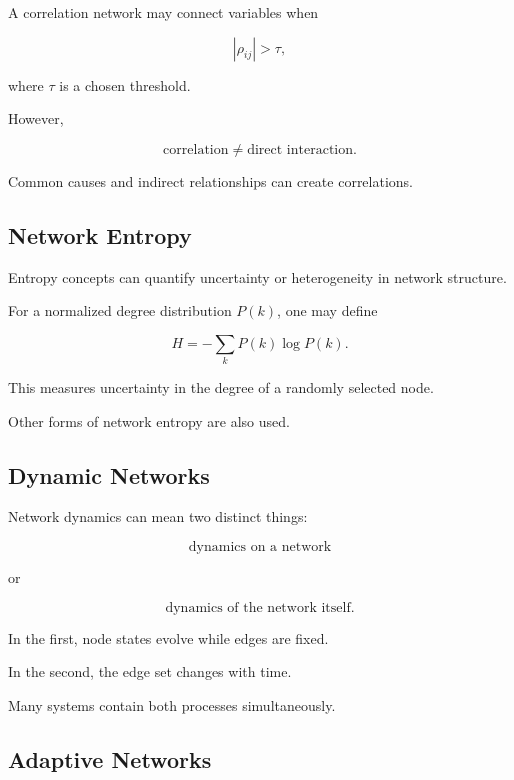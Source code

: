 A correlation network may connect variables when

\[
\boxed{
|\rho_{ij}|
>
\tau,
}
\]

where \(\tau\) is a chosen threshold.

However,

\[
\boxed{
\text{correlation}
\neq
\text{direct interaction}.
}
\]

Common causes and indirect relationships can create correlations.

\subsection{Network Entropy}
\label{subsec:network-entropy}

Entropy concepts can quantify uncertainty or heterogeneity in network
structure.

For a normalized degree distribution \(P(k)\), one may define

\[
\boxed{
H
=
-
\sum_k
P(k)\log P(k).
}
\]

This measures uncertainty in the degree of a randomly selected node.

Other forms of network entropy are also used.

\subsection{Dynamic Networks}
\label{subsec:dynamic-networks}

Network dynamics can mean two distinct things:

\[
\boxed{
\text{dynamics on a network}
}
\]

or

\[
\boxed{
\text{dynamics of the network itself}.
}
\]

In the first, node states evolve while edges are fixed.

In the second, the edge set changes with time.

Many systems contain both processes simultaneously.

\subsection{Adaptive Networks}
\label{subsec:adaptive-networks}

